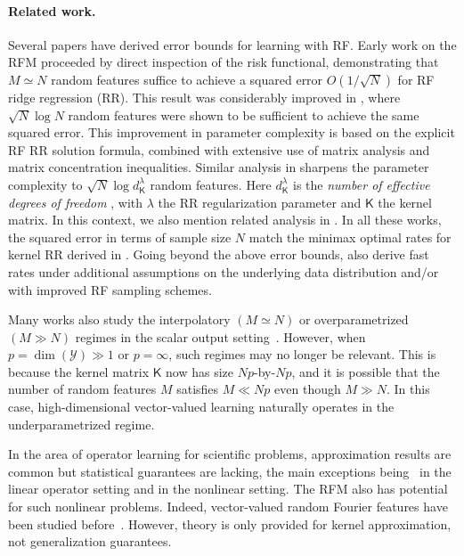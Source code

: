\documentclass{article}
\theoremstyle{plain}
\theoremstyle{my_def}
\theoremstyle{my_rem}
\numberwithin{equation}{section}
\numberwithin{theorem}{section}%
\newcommand{\cY}{\mathcal{Y}}
\begin{document}
\paragraph{Related work.}
Several papers have derived error bounds for learning with RF. Early work on the RFM \cite{RR2008} proceeded by direct inspection of the risk functional, demonstrating that $M\simeq N$ random features suffice to achieve a squared error $O(1/\sqrt{N})$ for RF ridge regression (RR). This result was considerably improved in \cite{rudi2017generalization}, where $\sqrt{N} \log N$ random features were shown to be sufficient to achieve the same squared error. This improvement in parameter complexity is based on the explicit RF RR solution formula, combined with extensive use of matrix analysis and matrix concentration inequalities. Similar analysis in \cite{li2021towards} sharpens the parameter complexity to $\sqrt{N} \log d^\lambda_{\mathsf{K}}$ random features. Here $d^\lambda_{\mathsf{K}}$ is the \emph{number of effective degrees of freedom} \cite{bach2017equivalence,caponnetto2007optimal}, with $\lambda$ the RR regularization parameter and $\mathsf{K}$ the kernel matrix. In this context, we also mention related analysis in \cite{bach2017equivalence}. In all these works, the squared error in terms of sample size $N$ match the minimax optimal rates for kernel RR derived in \cite{caponnetto2007optimal}. Going beyond the above error bounds, \cite{bach2017equivalence,li2021towards,rudi2017generalization} also derive fast rates under additional assumptions on the underlying data distribution and/or with improved RF sampling schemes.

Many works also study the interpolatory $(M\simeq N)$ or overparametrized $(M\gg N)$ regimes in the scalar output setting~\cite{chen2022concentration,ma2020min,ghorbani2021linearized,hashemi2023generalization,mei2022generalization}. However, when $p = \dim(\cY) \gg 1$ or $p=\infty$, such regimes may no longer be relevant. This is because the kernel matrix $\mathsf{K}$ now has size $Np$-by-$Np$, and it is possible that the number of random features $M$ satisfies $M\ll Np$ even though $M\gg N$. In this case, high-dimensional vector-valued learning naturally operates in the underparametrized regime.

In the area of operator learning for scientific problems, approximation results are common \cite{CDS2011,deng2021convergence,herrmann2022neural,gonon2023approximation,thfno,thdeeponet,ryck2022generic,SchwabZech2019} but statistical guarantees are lacking, the main exceptions being~\cite{boulle2022learning,de2023convergence,jin2022minimax,mollenhauer2022learning,schafer2021sparse,stepaniants2023learning} in the linear operator setting and \cite{caponnetto2007optimal} in the nonlinear setting. The RFM also has potential for such nonlinear problems. Indeed, vector-valued random Fourier features have been studied before~\cite{brault2016random,minh2016operator}. However, theory is only provided for kernel approximation, not generalization guarantees. 
\end{document}
